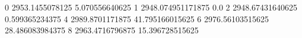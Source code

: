 0 2953.1455078125 5.070556640625
1 2948.074951171875 0.0
2 2948.67431640625 0.599365234375
4 2989.8701171875 41.795166015625
6 2976.56103515625 28.486083984375
8 2963.4716796875 15.396728515625

